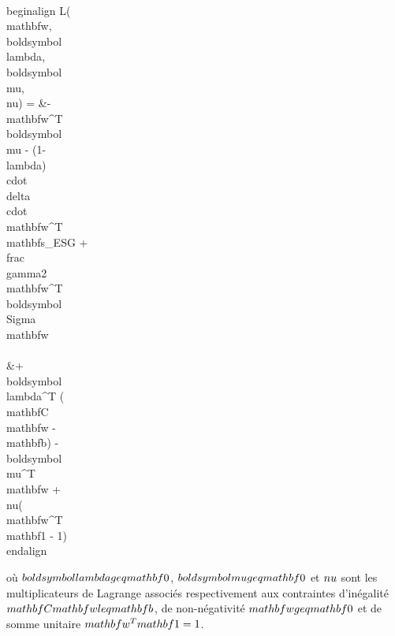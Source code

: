 \\begin{align}
L(\\mathbf{w}, \\boldsymbol{\\lambda}, \\boldsymbol{\\mu}, \\nu) = &-\\mathbf{w}^T \\boldsymbol{\\mu} - (1-\\lambda) \\cdot \\delta \\cdot \\mathbf{w}^T \\mathbf{s}_{ESG} + \\frac{\\gamma}{2}\\mathbf{w}^T \\boldsymbol{\\Sigma} \\mathbf{w} \\\\
&+ \\boldsymbol{\\lambda}^T (\\mathbf{C}\\mathbf{w} - \\mathbf{b}) - \\boldsymbol{\\mu}^T \\mathbf{w} + \\nu(\\mathbf{w}^T\\mathbf{1} - 1)
\\end{align}

où $\\boldsymbol{\\lambda} \\geq \\mathbf{0}$, $\\boldsymbol{\\mu} \\geq \\mathbf{0}$ et $\\nu$ sont les multiplicateurs de Lagrange associés respectivement aux contraintes d'inégalité $\\mathbf{C}\\mathbf{w} \\leq \\mathbf{b}$, de non-négativité $\\mathbf{w} \\geq \\mathbf{0}$ et de somme unitaire $\\mathbf{w}^T\\mathbf{1} = 1$.


